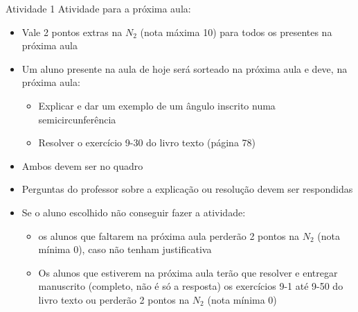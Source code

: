 \documentclass[t, brazilian, 11pt, aspectratio=169]{beamer}
\title{\Disciplina}
\author{\Professor}
\date{\Periodo}
\begin{document}
\begin{frame}{Atividade 1}
    Atividade para a próxima aula:
    \begin{itemize}
        \item Vale 2 pontos extras na \(N_2\) (nota máxima 10) para todos os 
            presentes na próxima aula
        \item Um aluno presente na aula de hoje será sorteado na próxima aula
            e deve, na próxima aula:
            \begin{itemize}
                \item Explicar e dar um exemplo de um ângulo inscrito numa 
                    semicircunferência
                \item Resolver o exercício 9-30 do livro texto (página 78)
            \end{itemize}
        \item Ambos devem ser no quadro
        \item Perguntas do professor sobre a explicação ou resolução devem ser
            respondidas
        \item Se o aluno escolhido não conseguir fazer a atividade:
            \begin{itemize}
                \item os alunos que faltarem na próxima aula perderão 2 pontos na \(N_2\) 
                    (nota mínima 0), caso não tenham justificativa
                \item Os alunos que estiverem na próxima aula terão que resolver e 
                    entregar manuscrito (completo, não é só a resposta) os exercícios
                    9-1 até 9-50 do livro texto ou perderão 2 pontos na \(N_2\) (nota mínima 0)
            \end{itemize}
    \end{itemize}
\end{frame}
\end{document}
